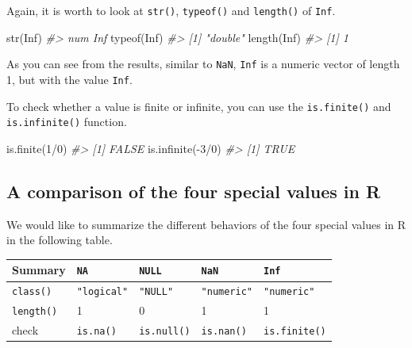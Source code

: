 \documentclass[
]{book}
\newenvironment{Shaded}{\begin{snugshade}}{\end{snugshade}}
\newcommand{\CommentTok}[1]{\textcolor[rgb]{0.56,0.35,0.01}{\textit{#1}}}
\newcommand{\ConstantTok}[1]{\textcolor[rgb]{0.00,0.00,0.00}{#1}}
\newcommand{\DecValTok}[1]{\textcolor[rgb]{0.00,0.00,0.81}{#1}}
\newcommand{\FunctionTok}[1]{\textcolor[rgb]{0.00,0.00,0.00}{#1}}
\newcommand{\NormalTok}[1]{#1}
\newcommand{\SpecialCharTok}[1]{\textcolor[rgb]{0.00,0.00,0.00}{#1}}
\begin{document}
Again, it is worth to look at \texttt{str()}, \texttt{typeof()} and \texttt{length()} of \texttt{Inf}.

\begin{Shaded}
\begin{Highlighting}[]
\FunctionTok{str}\NormalTok{(}\ConstantTok{Inf}\NormalTok{)}
\CommentTok{\#\textgreater{}  num Inf}
\FunctionTok{typeof}\NormalTok{(}\ConstantTok{Inf}\NormalTok{)}
\CommentTok{\#\textgreater{} [1] "double"}
\FunctionTok{length}\NormalTok{(}\ConstantTok{Inf}\NormalTok{)}
\CommentTok{\#\textgreater{} [1] 1}
\end{Highlighting}
\end{Shaded}

As you can see from the results, similar to \texttt{NaN}, \texttt{Inf} is a numeric vector of length 1, but with the value \texttt{Inf}.

To check whether a value is finite or infinite, you can use the \texttt{is.finite()} and \texttt{is.infinite()} function.

\begin{Shaded}
\begin{Highlighting}[]
\FunctionTok{is.finite}\NormalTok{(}\DecValTok{1}\SpecialCharTok{/}\DecValTok{0}\NormalTok{)}
\CommentTok{\#\textgreater{} [1] FALSE}
\FunctionTok{is.infinite}\NormalTok{(}\SpecialCharTok{{-}}\DecValTok{3}\SpecialCharTok{/}\DecValTok{0}\NormalTok{)}
\CommentTok{\#\textgreater{} [1] TRUE}
\end{Highlighting}
\end{Shaded}

\hypertarget{a-comparison-of-the-four-special-values-in-r}{%
\subsection{A comparison of the four special values in R}\label{a-comparison-of-the-four-special-values-in-r}}

We would like to summarize the different behaviors of the four special values in R in the following table.

\begin{longtable}[]{@{}lllll@{}}
\toprule
Summary & \texttt{NA} & \texttt{NULL} & \texttt{NaN} & \texttt{Inf} \\
\midrule
\endhead
\texttt{class()} & \texttt{"logical"} & \texttt{"NULL"} & \texttt{"numeric"} & \texttt{"numeric"} \\
\texttt{length()} & 1 & 0 & 1 & 1 \\
check & \texttt{is.na()} & \texttt{is.null()} & \texttt{is.nan()} & \texttt{is.finite()} \\
\bottomrule
\end{longtable}
\end{document}
